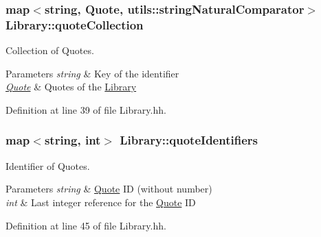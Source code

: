 \subsubsection[{\texorpdfstring{quote\+Collection}{quoteCollection}}]{\setlength{\rightskip}{0pt plus 5cm}map$<$string, {\bf Quote}, {\bf utils\+::string\+Natural\+Comparator}$>$ Library\+::quote\+Collection\hspace{0.3cm}{\ttfamily [private]}}\hypertarget{class_library_a0f9136df5fc6e8901cb8524e026cb147}{}\label{class_library_a0f9136df5fc6e8901cb8524e026cb147}


Collection of Quotes. 


\begin{DoxyParams}{Parameters}
{\em string} & Key of the identifier \\
\hline
{\em \hyperlink{class_quote}{Quote}} & Quotes of the \hyperlink{class_library}{Library} \\
\hline
\end{DoxyParams}


Definition at line 39 of file Library.\+hh.

\subsubsection[{\texorpdfstring{quote\+Identifiers}{quoteIdentifiers}}]{\setlength{\rightskip}{0pt plus 5cm}map$<$string, int$>$ Library\+::quote\+Identifiers\hspace{0.3cm}{\ttfamily [private]}}\hypertarget{class_library_a58c1f12a0278872cd0299e586551bb7a}{}\label{class_library_a58c1f12a0278872cd0299e586551bb7a}


Identifier of Quotes. 


\begin{DoxyParams}{Parameters}
{\em string} & \hyperlink{class_quote}{Quote} ID (without number) \\
\hline
{\em int} & Last integer reference for the \hyperlink{class_quote}{Quote} ID \\
\hline
\end{DoxyParams}


Definition at line 45 of file Library.\+hh.

